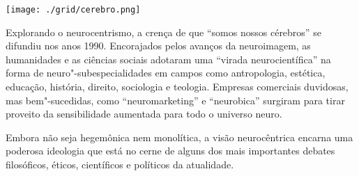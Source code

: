 \pagebreak %

\begin{center}
\hspace*{.5cm}\texttt{[image: ./grid/cerebro.png]}
\end{center}

\hspace*{-7cm}\hrulefill\hspace*{-7cm}

\medskip

\noindent{}Explorando o neurocentrismo, a crença de que “somos nossos cérebros” se difundiu nos anos 1990. Encorajados pelos avanços da neuroimagem, as humanidades e as ciências sociais adotaram uma “virada neurocientífica” na forma de neuro"-subespecialidades em campos como antropologia, estética, educação, história, direito, sociologia e teologia. Empresas comerciais duvidosas, mas bem"-sucedidas, como “neuromarketing” e “neurobica” surgiram para tirar proveito da sensibilidade aumentada para todo o universo neuro.

Embora não seja hegemônica nem monolítica, a visão neurocêntrica encarna uma poderosa ideologia que está no cerne de alguns dos mais importantes debates filosóficos, éticos, científicos e políticos da atualidade.  


\vfill

\hspace*{-.4cm}\begin{minipage}[c]{.5\linewidth}
\small{
{}}
\end{minipage}

\pagebreak %


